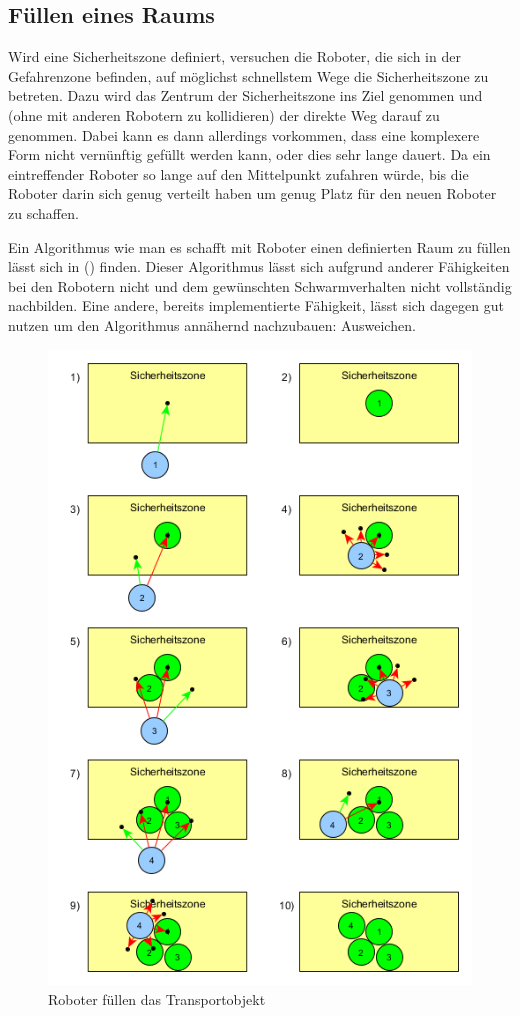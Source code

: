 \subsection*{Füllen eines Raums}

Wird eine Sicherheitszone definiert, versuchen die Roboter, die sich in der Gefahrenzone befinden, auf möglichst schnellstem Wege die Sicherheitszone zu betreten. Dazu wird das Zentrum der Sicherheitszone ins Ziel genommen und (ohne mit anderen Robotern zu kollidieren) der direkte Weg darauf zu genommen. Dabei kann es dann allerdings vorkommen, dass eine komplexere Form nicht vernünftig gefüllt werden kann, oder dies sehr lange dauert. Da ein eintreffender Roboter so lange auf den Mittelpunkt zufahren würde, bis die Roboter darin sich genug verteilt haben um genug Platz für den neuen Roboter zu schaffen.

Ein Algorithmus wie man es schafft mit Roboter einen definierten Raum zu füllen lässt sich in () finden. Dieser Algorithmus lässt sich aufgrund anderer Fähigkeiten bei den Robotern nicht und dem gewünschten Schwarmverhalten nicht vollständig nachbilden. Eine andere, bereits implementierte Fähigkeit, lässt sich dagegen gut nutzen um den Algorithmus annähernd nachzubauen: Ausweichen.

\begin{figure}
	\includegraphics[width=\pictureWidth,keepaspectratio]{graphics/AlgorithmusAusweichenTransport.png}
	\caption{Roboter füllen das Transportobjekt}
	\label{pic:AlgorithmusAusweichenObjekt}
\end{figure}

